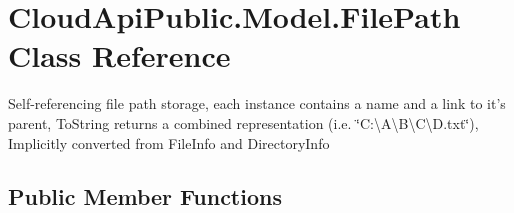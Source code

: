 \hypertarget{class_cloud_api_public_1_1_model_1_1_file_path}{\section{Cloud\-Api\-Public.\-Model.\-File\-Path Class Reference}
\label{class_cloud_api_public_1_1_model_1_1_file_path}
}


Self-\/referencing file path storage, each instance contains a name and a link to it's parent, To\-String returns a combined representation (i.\-e. \char`\"{}\-C\-:\textbackslash{}\-A\textbackslash{}\-B\textbackslash{}\-C\textbackslash{}\-D.\-txt\char`\"{}), Implicitly converted from File\-Info and Directory\-Info  


\subsection*{Public Member Functions}
